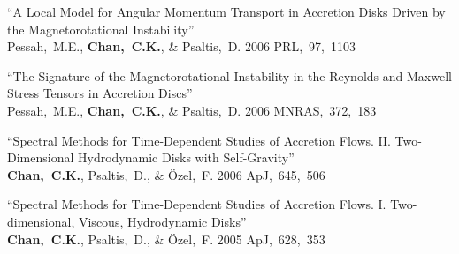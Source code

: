 \begin{ilist}
\item ``A Local Model for Angular Momentum Transport in Accretion Disks Driven by the Magnetorotational Instability''\\
  Pessah,~M.E., \textbf{Chan,~C.K.}, \& Psaltis,~D.
  2006 PRL,~97,~1103

\item ``The Signature of the Magnetorotational Instability in the Reynolds and Maxwell Stress Tensors in Accretion Discs''\\
  Pessah,~M.E., \textbf{Chan,~C.K.}, \& Psaltis,~D.
  2006 MNRAS,~372,~183

\item ``Spectral Methods for Time-Dependent Studies of Accretion Flows.
  II. Two-Dimensional Hydrodynamic Disks with Self-Gravity''\\
  \textbf{Chan,~C.K.}, Psaltis,~D., \& \"Ozel,~F.
  2006 ApJ,~645,~506

\item ``Spectral Methods for Time-Dependent Studies of Accretion Flows.
  I. Two-dimensional, Viscous, Hydrodynamic Disks''\\
  \textbf{Chan,~C.K.}, Psaltis,~D., \& \"Ozel,~F.
  2005 ApJ,~628,~353

\end{ilist}
